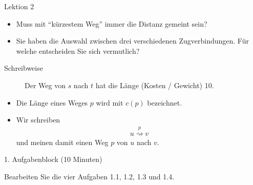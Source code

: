 \begin{frame}[fragile]{Lektion 2}
\begin{itemize}[<+->]
    \item Muss mit \enquote{kürzestem Weg} immer die Distanz gemeint sein?
    \item Sie haben die Auswahl zwischen drei verschiedenen Zugverbindungen. Für welche entscheiden Sie sich vermutlich?
\end{itemize}
\end{frame}


\begin{frame}[fragile]{Schreibweise}
\begin{figure}[H]
\centering
{}
    \caption*{Der Weg von $s$ nach $t$ hat die Länge (Kosten / Gewicht) 10.}
    \label{fig:xy}
\end{figure}
\noindent
\begin{itemize}
    \item Die Länge eines Weges $p$ wird mit $c(p)$ bezeichnet.
    \item Wir schreiben
\begin{align*}
    u \stackrel{p}{\rightsquigarrow} v
\end{align*}
und meinen damit einen Weg $p$ von $u$ nach $v$.
\end{itemize}
\end{frame}


\begin{frame}[fragile]{1. Aufgabenblock (10 Minuten)}
\begin{center}
    Bearbeiten Sie die vier Aufgaben 1.1, 1.2, 1.3 und 1.4.
\end{center}
\end{frame}

